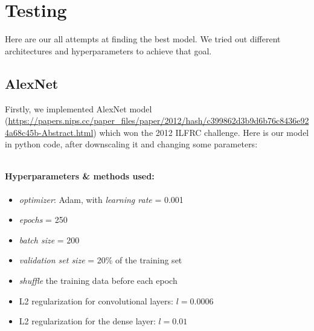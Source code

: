 \documentclass[12pt]{article}
\begin{document}
  \section{Testing}
    Here are our all attempts at finding the best model. We tried out different architectures and hyperparameters to achieve that goal.
    \subsection{AlexNet}
      Firstly, we implemented AlexNet model (\url{https://papers.nips.cc/paper_files/paper/2012/hash/c399862d3b9d6b76c8436e924a68c45b-Abstract.html})
      which won the 2012 ILFRC challenge. Here is our model in python code, after downscaling it and changing some parameters:
      \inputminted[linenos]{python}{code/alexnet.py}
      \paragraph{Hyperparameters \& methods used:}
        \begin{itemize}
          \item \textit{optimizer}: Adam, with \textit{learning rate} = 0.001
          \item \textit{epochs} = 250
          \item \textit{batch size} = 200
          \item \textit{validation set size} = 20\% of the training set
          \item \textit{shuffle} the training data before each epoch
          \item L2 regularization for convolutional layers: $l = 0.0006$
          \item L2 regularization for the dense layer: $l = 0.01$
        \end{itemize}
\end{document}
